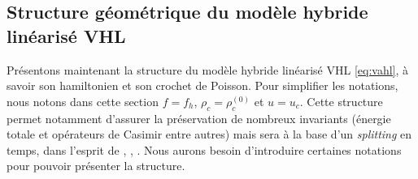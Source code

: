 
\subsection{Structure géométrique du modèle hybride linéarisé VHL}
\label{s:geom}

Présentons maintenant la structure du modèle hybride linéarisé VHL \eqref{eq:vahl}, à savoir son hamiltonien et son crochet de Poisson. Pour simplifier les notations, nous notons dans cette section $f=f_h$, $\rho_c=\rho_c^{(0)}$ et $u=u_c$. Cette structure permet notamment d'assurer la préservation de nombreux invariants (énergie totale et opérateurs de Casimir entre autres) mais sera à la base d'un \emph{splitting} en temps, dans l'esprit de \cite{Crouseilles:2015}, \cite{Casas:2017}, \cite{Kraus:2017} \cite{Li:2020}. Nous aurons besoin d'introduire certaines notations pour pouvoir présenter la structure.

